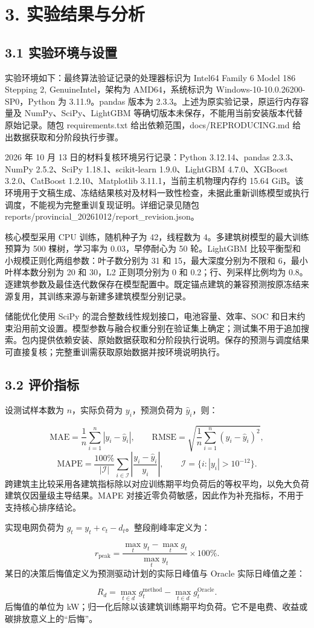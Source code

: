 \documentclass[12pt,a4paper]{article}
\begin{document}
\section{3. 实验结果与分析}
\subsection{3.1 实验环境与设置}
实验环境如下：最终算法验证记录的处理器标识为 Intel64 Family 6 Model 186 Stepping 2, GenuineIntel，架构为 AMD64，系统标识为 Windows-10-10.0.26200-SP0，Python 为 3.11.9。pandas 版本为 2.3.3。上述为原实验记录，原运行内存容量及 NumPy、SciPy、LightGBM 等确切版本未保存，不能用当前安装版本代替原始记录。随包 requirements.txt 给出依赖范围，docs/REPRODUCING.md 给出数据获取和分阶段执行步骤。\par
2026 年 10 月 13 日的材料复核环境另行记录：Python 3.12.14、pandas 2.3.3、NumPy 2.5.2、SciPy 1.18.1、scikit-learn 1.9.0、LightGBM 4.7.0、XGBoost 3.2.0、CatBoost 1.2.10、Matplotlib 3.11.1，当前主机物理内存约 15.64 GiB。该环境用于文稿生成、冻结结果核对及材料一致性检查，未据此重新训练模型或执行调度，不能视为完整重训复现证明。详细记录见随包 reports/provincial\_20261012/report\_revision.json。\par
核心模型采用 CPU 训练，随机种子为 42，线程数为 4。多建筑树模型的最大训练预算为 500 棵树，学习率为 0.03，早停耐心为 50 轮。LightGBM 比较平衡型和小规模正则化两组参数：叶子数分别为 31 和 15，最大深度分别为不限和 6，最小叶样本数分别为 20 和 30，L2 正则项分别为 0 和 0.2；行、列采样比例均为 0.8。逐建筑参数及最佳迭代数保存在模型配置中。既定锚点建筑的兼容预测按原冻结来源复用，其训练来源与新建多建筑模型分别记录。\par
储能优化使用 SciPy 的混合整数线性规划接口，电池容量、效率、SOC 和日末约束沿用前文设置。模型参数与融合权重分别在验证集上确定；测试集不用于追加搜索。包内提供依赖安装、原始数据获取和分阶段执行说明。保存的预测与调度结果可直接复核；完整重训需获取原始数据并按环境说明执行。\par
\subsection{3.2 评价指标}
设测试样本数为 \(n\)，实际负荷为 \(y_i\)，预测负荷为 \(\hat{y}_i\)，则：\par
\[
\mathrm{MAE}=\frac{1}{n}\sum_{i=1}^{n}|y_i-\hat{y}_i|,
\qquad
\mathrm{RMSE}=\sqrt{\frac{1}{n}\sum_{i=1}^{n}(y_i-\hat{y}_i)^2},
\]
\[
\mathrm{MAPE}=\frac{100\%}{|\mathcal I|}\sum_{i\in\mathcal I}\left|\frac{y_i-\hat{y}_i}{y_i}\right|,
\qquad \mathcal I=\{i:|y_i|>10^{-12}\}.
\]
跨建筑主比较采用各建筑指标除以对应训练期平均负荷后的等权平均，以免大负荷建筑仅因量级主导结果。MAPE 对接近零负荷敏感，因此作为补充指标，不用于支持核心排序结论。\par
实现电网负荷为 \(g_t=y_t+c_t-d_t\)。整段削峰率定义为：\par
\[
r_{\text{peak}}=\frac{\max_t y_t-\max_t g_t}{\max_t y_t}\times100\%.
\]
某日的决策后悔值定义为预测驱动计划的实际日峰值与 Oracle 实际日峰值之差：\par
\[
R_d=\max_{t\in d}g_t^{\text{method}}-\max_{t\in d}g_t^{\text{Oracle}}.
\]
后悔值的单位为 kW；归一化后除以该建筑训练期平均负荷。它不是电费、收益或碳排放意义上的“后悔”。\par
\end{document}
